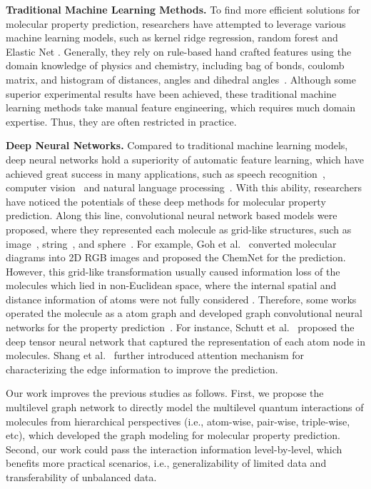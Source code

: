 \documentclass[letterpaper]{article} \usepackage{bm}
\begin{document}
\textbf{Traditional Machine Learning Methods.}
To find more efficient solutions for molecular property prediction, researchers have attempted to leverage various machine learning models, such as kernel ridge regression, random forest and Elastic Net \cite{faber2017prediction,zou2005regularization,mcdonagh2017machine}. Generally, they rely on rule-based hand crafted features using the domain knowledge of physics and chemistry, including bag of bonds, coulomb matrix, and histogram of distances, angles and dihedral angles~\cite{huang2016communication,hansen2015machine,montavon2012learning}. Although some superior experimental results have been achieved, these traditional machine learning methods take manual feature engineering, which requires much domain expertise. Thus, they are often restricted in practice.


\textbf{Deep Neural Networks.}
Compared to traditional machine learning models, deep neural networks hold a superiority of automatic feature learning, which have achieved great success in many applications, such as speech recognition~\cite{zhu2016co}, computer vision~\cite{lecun1995convolutional} and natural language processing~\cite{collobert2008unified}. With this ability, researchers have noticed the potentials of these deep methods for molecular property prediction. Along this line, convolutional neural network based models were proposed, where they represented each molecule as grid-like structures, such as image~\cite{goh2017chemnet}, string~\cite{GmezBombarelli2018AutomaticCD}, and sphere~\cite{boomsma2017spherical}. For example, Goh et al.~ converted molecular diagrams into 2D RGB images and proposed the ChemNet for the prediction. However, this grid-like transformation usually caused information loss of the molecules which lied in non-Euclidean space, where the internal spatial and distance information of atoms were not fully considered \cite{bronstein2017geometric}. Therefore, some works operated the molecule as a atom graph and developed graph convolutional neural networks for the property prediction~\cite{schutt2017quantum,Gilmer2017NeuralMP}. For instance, Schutt et al.~ proposed the deep tensor neural network that captured the representation of each atom node in molecules. Shang et al.~ further introduced attention mechanism for characterizing the edge information to improve the prediction.

Our work improves the previous studies as follows. First, we propose the multilevel graph network to directly model the multilevel quantum interactions of molecules from hierarchical perspectives (i.e., atom-wise, pair-wise, triple-wise, etc), which developed the graph modeling for molecular property prediction. Second, our work could pass the interaction information level-by-level, which benefits more practical scenarios, i.e., generalizability of limited data and transferability of unbalanced data.
\end{document}
